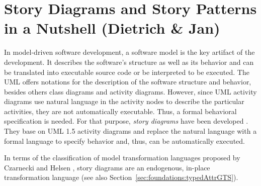 \section{Story Diagrams and Story Patterns in a Nutshell (Dietrich \& Jan)} \label{sec:Overview}



In model-driven software development, a software model is the key artifact of the development.
It describes the software's structure as well as its behavior and 
can be translated into executable source code or be interpreted to be executed.
The UML offers notations for the description of the software structure and behavior,
besides others class diagrams and activity diagrams.
However, since UML activity diagrams use natural language in the activity nodes to describe the particular activities, they are not automatically executable.
Thus, a formal behavioral specification is needed.
For that purpose, \emph{story diagrams} have been developed \cite{FNTZ00,Zun01}.
They base on UML 1.5 \cite{UML1.5} activity diagrams and replace the natural language with a formal language to specify behavior
and, thus, can be automatically executed.

In terms of the classification of model transformation languages proposed by Czarnecki and Helsen \cite{Czarnecki06},
story diagrams are an endogenous, in-place transformation language (see also Section~\ref{sec:foundations:typedAttrGTS}).


